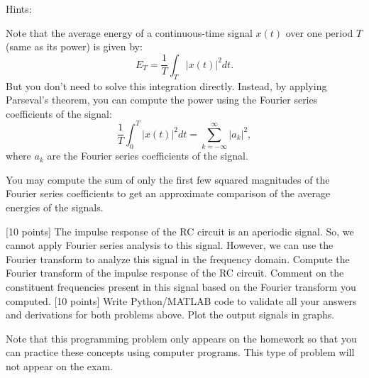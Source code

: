 \documentclass{ee102_pset}
\begin{document}
Hints:

Note that the average energy of a continuous-time signal $x(t)$ over one period $T$ (same as its power) is given by:
\[
E_T = \frac{1}{T} \int_{T} |x(t)|^2 dt.
\]
But you don't need to solve this integration directly. Instead, by applying Parseval's theorem, you can compute the power using the Fourier series coefficients of the signal:
\[
\frac{1}{T} \int_{0}^{T} |x(t)|^2 dt = \sum_{k=-\infty}^{\infty} |a_k|^2,
\]
where $a_k$ are the Fourier series coefficients of the signal.

You may compute the sum of only the first few squared magnitudes of the Fourier series coefficients to get an approximate comparison of the average energies of the signals. 

[10 points] The impulse response of the RC circuit is an aperiodic signal. So, we cannot apply Fourier series analysis to this signal. However, we can use the Fourier transform to analyze this signal in the frequency domain. Compute the Fourier transform of the impulse response of the RC circuit. Comment on the constituent frequencies present in this signal based on the Fourier transform you computed.
[10 points] Write Python/MATLAB code to validate all your answers and derivations for both problems above. Plot the output signals in graphs.  

{\color{red}Note that this programming problem only appears on the homework so that you can practice these concepts using computer programs. This type of problem will not appear on the exam.}
\end{document}
